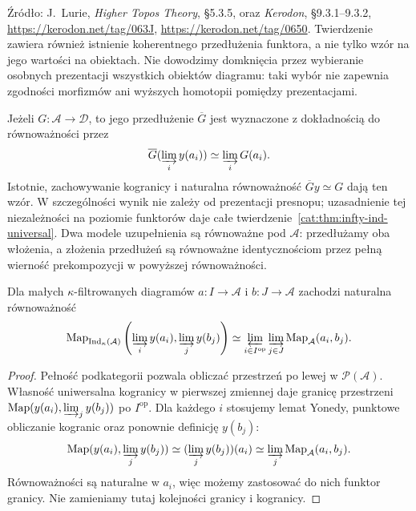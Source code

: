 Źródło: J.~Lurie, \emph{Higher Topos Theory}, \S5.3.5, oraz \emph{Kerodon}, \S9.3.1--9.3.2, \url{https://kerodon.net/tag/063J}, \url{https://kerodon.net/tag/0650}. Twierdzenie zawiera również istnienie koherentnego przedłużenia funktora, a nie tylko wzór na jego wartości na obiektach. Nie dowodzimy domknięcia przez wybieranie osobnych prezentacji wszystkich obiektów diagramu: taki wybór nie zapewnia zgodności morfizmów ani wyższych homotopii pomiędzy prezentacjami.

Jeżeli $G:\mathcal A\to\mathcal D$, to jego przedłużenie $\overline G$ jest wyznaczone z dokładnością do równoważności przez
\[
 \overline G(\varinjlim_i y(a_i))\simeq\varinjlim_i G(a_i).
\]
Istotnie, zachowywanie kogranicy i naturalna równoważność $\overline G y\simeq G$ dają ten wzór. W szczególności wynik nie zależy od prezentacji presnopu; uzasadnienie tej niezależności na poziomie funktorów daje całe twierdzenie~\ref{cat:thm:infty-ind-universal}. Dwa modele uzupełnienia są równoważne pod $\mathcal A$: przedłużamy oba włożenia, a złożenia przedłużeń są równoważne identycznościom przez pełną wierność prekompozycji w powyższej równoważności.

\begin{stwierdzenie}\label{cat:prop:infty-ind-mapping}
Dla małych $\kappa$-filtrowanych diagramów $a:I\to\mathcal A$ i $b:J\to\mathcal A$ zachodzi naturalna równoważność
\begin{equation}\label{cat:eq:infty-ind-mapping}
 \operatorname{Map}_{\operatorname{Ind}_\kappa(\mathcal A)}
 \left(\varinjlim_i y(a_i),\varinjlim_j y(b_j)\right)
 \simeq\varprojlim_{i\in I^{\mathrm{op}}}\varinjlim_{j\in J}
 \operatorname{Map}_{\mathcal A}(a_i,b_j).
\end{equation}
\end{stwierdzenie}
\begin{proof}
Pełność podkategorii pozwala obliczać przestrzeń po lewej w $\mathcal P(\mathcal A)$. Własność uniwersalna kogranicy w pierwszej zmiennej daje granicę przestrzeni $\operatorname{Map}(y(a_i),\varinjlim_j y(b_j))$ po $I^{\mathrm{op}}$. Dla każdego $i$ stosujemy lemat Yonedy, punktowe obliczanie kogranic oraz ponownie definicję $y(b_j)$:
\[
 \operatorname{Map}(y(a_i),\varinjlim_j y(b_j))
 \simeq (\varinjlim_j y(b_j))(a_i)
 \simeq\varinjlim_j \operatorname{Map}_{\mathcal A}(a_i,b_j).
\]
Równoważności są naturalne w $a_i$, więc możemy zastosować do nich funktor granicy. Nie zamieniamy tutaj kolejności granicy i kogranicy.
\end{proof}

